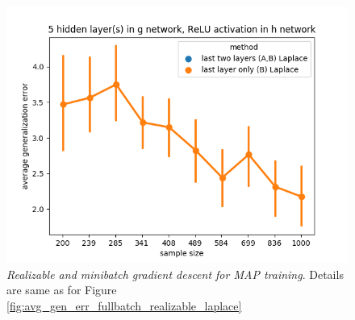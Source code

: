 \documentclass{article} %
\begin{document}
\begin{figure}[t!]
\begin{center}
		\includegraphics[scale=0.35]{laplace_taskid15.png}
	\end{center}
	\caption{\textit{Realizable and minibatch gradient descent for MAP training}. Details are same as for Figure \ref{fig:avg_gen_err_fullbatch_realizable_laplace}}
	\label{fig:avg_gen_err_minibatch_realizable_laplace}
\end{figure}
\end{document}
